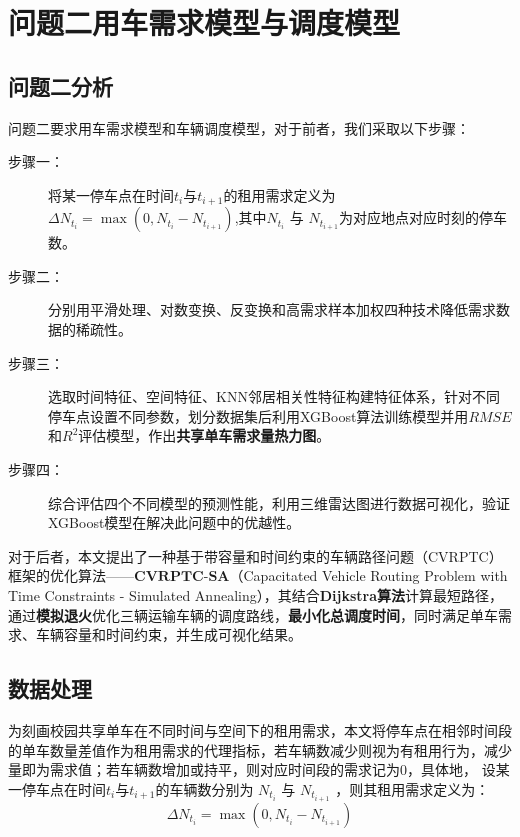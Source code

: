 \documentclass[withoutpreface,bwprint]{cumcmthesis}
\begin{document}
\section{问题二\hspace{1em}用车需求模型与调度模型}
\subsection{问题二分析}
问题二要求用车需求模型和车辆调度模型，对于前者，我们采取以下步骤：
\begin{description}
    \item[步骤一：]将某一停车点在时间$t_i$与$t_{i+1}$的租用需求定义为  
    $\Delta N_{t_i} = \max(0, N_{t_i} - N_{t_{i+1}})$,其中$N_{t_i}$ 与 $N_{t_{i+1}}$为对应地点对应时刻的停车数。
    \item[步骤二：]分别用平滑处理、对数变换、反变换和高需求样本加权四种技术降低需求数据的稀疏性。
    \item[步骤三：]选取时间特征、空间特征、KNN邻居相关性特征构建特征体系，针对不同停车点设置不同参数，划分数据集后利用XGBoost算法训练模型并用$RMSE$和$R^2$评估模型，作出\textbf{共享单车需求量热力图}。
    \item[步骤四：]综合评估四个不同模型的预测性能，利用三维雷达图进行数据可视化，验证XGBoost模型在解决此问题中的优越性。
\end{description} \par
对于后者，本文提出了一种基于带容量和时间约束的车辆路径问题（CVRPTC）框架的优化算法——$\textbf{CVRPTC-SA}$（Capacitated Vehicle Routing Problem with Time Constraints - Simulated Annealing），其结合\textbf{Dijkstra算法}计算最短路径，通过\textbf{模拟退火}优化三辆运输车辆的调度路线，\textbf{最小化总调度时间}，同时满足单车需求、车辆容量和时间约束，并生成可视化结果。
\subsection{数据处理}
 为刻画校园共享单车在不同时间与空间下的租用需求，本文将停车点在相邻时间段的单车数量差值作为租用需求的代理指标，若车辆数减少则视为有租用行为，减少量即为需求值；若车辆数增加或持平，则对应时间段的需求记为0，具体地，
设某一停车点在时间$t_i$与$t_{i+1}$的车辆数分别为 $N_{t_i}$ 与 $N_{t_{i+1}}$ ，则其租用需求定义为：
 \begin{equation}  
    \Delta N_{t_i} = \max(0, N_{t_i} - N_{t_{i+1}})
 \end{equation}
\end{document}
